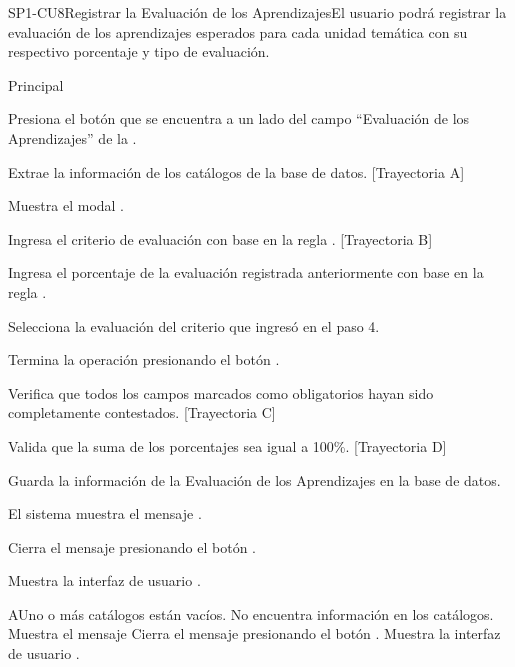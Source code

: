 \begin{UseCase}{SP1-CU8}{Registrar la Evaluación de los Aprendizajes}{El usuario podrá registrar la evaluación de los aprendizajes esperados para cada unidad temática con su respectivo porcentaje y tipo de evaluación.}
\begin{UCtrayectoria}{Principal}

	\UCpaso[\UCactor] Presiona el botón \BtnModal que se encuentra a un lado del campo ``Evaluación de los Aprendizajes'' de la .
	
	\UCpaso Extrae la información de los catálogos de la base de datos. [Trayectoria A]

    \UCpaso Muestra el modal .
    
    \UCpaso[\UCactor] Ingresa el criterio de evaluación con base en la regla . [Trayectoria B]

    \UCpaso[\UCactor] Ingresa el porcentaje de la evaluación registrada anteriormente con base en la regla .
    
    \UCpaso[\UCactor] Selecciona la evaluación del criterio que ingresó en el paso 4.
    
    \UCpaso[\UCactor] Termina la operación presionando el botón .

    \UCpaso Verifica que todos los campos marcados como obligatorios hayan sido completamente contestados. [Trayectoria C]

    \UCpaso Valida que la suma de los porcentajes sea igual a 100\%. [Trayectoria D]

    \UCpaso Guarda la información de la Evaluación de los Aprendizajes en la base de datos.

    \UCpaso El sistema muestra el mensaje .

    \UCpaso[\UCactor] Cierra el mensaje presionando el botón .

    \UCpaso Muestra la interfaz de usuario .
    
\end{UCtrayectoria}


\begin{UCtrayectoriaA}{A}{Uno o más catálogos están vacíos}.
	\UCpaso No encuentra información en los catálogos.
    \UCpaso Muestra el mensaje 
    \UCpaso[\UCactor] Cierra el mensaje presionando el botón .
	\UCpaso Muestra la interfaz de usuario .
\end{UCtrayectoriaA}


\end{UseCase}
